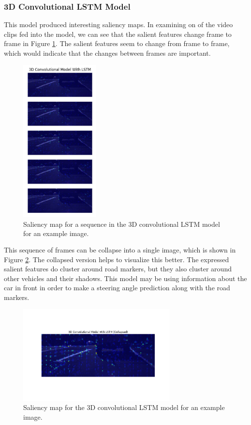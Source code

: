 \documentclass[10pt,twocolumn,letterpaper]{article}
\begin{document}
\subsubsection{3D Convolutional LSTM Model}


This model produced interesting saliency maps. In examining on of the video clips fed into the model, we can see that the salient features change frame to frame in Figure \ref{3d_full}. The salient features seem to change from frame to frame, which would indicate that the changes between frames are important.
\begin{figure}[!htb]
    \includegraphics[width=4cm]{3d_lstm_full_title.png}
    \centering
    \caption{Saliency map for a sequence in the 3D convolutional LSTM model for an example image.}
    \label{3d_full}
\end{figure}

 This sequence of frames can be collapse into a single image, which is shown in Figure \ref{3d_collapse}. The collapsed version helps to visualize this better. The expressed salient features do cluster around road markers, but they also cluster around other vehicles and their shadows. This model may be using information about the car in front in order to make a steering angle prediction along with the road markers. 

\begin{figure}[!htb]
	\includegraphics[width=8cm]{3d_full_v2_collapsed.png}
	\centering
	\caption{Saliency map for the 3D convolutional LSTM model for an example image.}
	\label{3d_collapse}
\end{figure}
\end{document}

